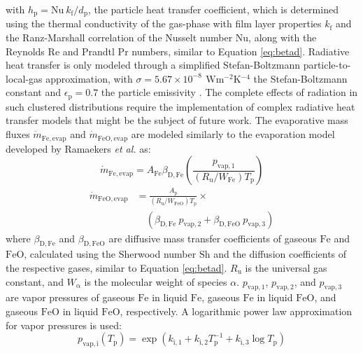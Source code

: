 \documentclass[times,twocolumn,final]{elsarticle}
\newcommand{\mrm}[1]{\mathrm{#1}}
\newcommand{\redd}{\color{red}}
\newcommand{\redd}{}
\begin{document}
{\noindent with {\redd $h_\mrm{p} = \mrm{Nu}\ k_\mrm{f} / d_\mrm{p}$}, the particle heat transfer coefficient, which is determined using the thermal conductivity of the gas-phase with film layer properties $k_\mrm{f}$ and the Ranz-Marshall correlation of the Nusselt number $\mrm{Nu}$, along with the Reynolds $\mrm{Re}$ and Prandtl $\mrm{Pr}$ numbers, similar to Equation \ref{eq:betad}. Radiative heat transfer is only modeled through a simplified Stefan-Boltzmann particle-to-local-gas approximation, with $\sigma=5.67\times10^{-8}\, \SI{}{\watt\meter^{-2}\kelvin^{-4}}$ the Stefan-Boltzmann constant and $\epsilon_\mrm{p}=0.7$ the particle emissivity \cite{wenjian2026}. {\redd The complete effects of radiation in such clustered distributions require the implementation of complex radiative heat transfer models that might be the subject of future work.} The evaporative mass fluxes $\dot{m}_\mrm{Fe,evap}$ and $\dot{m}_\mrm{FeO,evap}$  are modeled similarly to the evaporation model developed by Ramaekers \emph{et al.} \cite{ramaekers2025} as:
\begin{equation}
    \dot{m}_\mrm{Fe,evap} = A_\mrm{Fe} \beta_\mrm{D,Fe} \left( \frac{p_\mrm{vap,1}}{(R_\mrm{u}/W_\mrm{Fe}) T_\mrm{p}}\right)
\end{equation}
\begin{equation}
    \begin{split}
         \dot{m}_\mrm{FeO,evap} &= \frac{A_\mrm{p}}{(R_\mrm{u}/W_\mrm{FeO}) T_\mrm{p}} \times \\ &\quad(\beta_\mrm{D,Fe}\ p_\mrm{vap,2} + \beta_\mrm{D,FeO}\ p_\mrm{vap,3})
    \end{split}
\end{equation}
where $\beta_\mrm{D,Fe}$ and $\beta_\mrm{D,FeO}$ are diffusive mass transfer coefficients of gaseous $\mrm{Fe}$ and $\mrm{FeO}$, calculated using the Sherwood number $\mrm{Sh}$ and the diffusion coefficients of the respective gases, similar to Equation \ref{eq:betad}. $R_\mrm{u}$ is the universal gas constant, and $W_\mrm{\alpha}$ is the molecular weight of species $\alpha$. $p_\mrm{vap,1}$, $p_\mrm{vap,2}$, and $p_\mrm{vap,3}$ are vapor pressures of gaseous $\mrm{Fe}$ in liquid $\mrm{Fe}$, gaseous $\mrm{Fe}$ in liquid $\mrm{FeO}$, and gaseous $\mrm{FeO}$ in liquid $\mrm{FeO}$, respectively. A logarithmic power law approximation for vapor pressures is used:
\begin{equation}
p_\mrm{vap,i}\left(T_\mrm{p}\right) = \exp \left(k_\mrm{i,1} + k_\mrm{i,2} T_\mrm{p}^{-1} + k_\mrm{i,3} \log T_\mrm{p} \right)
\end{equation}
}
\end{document}
